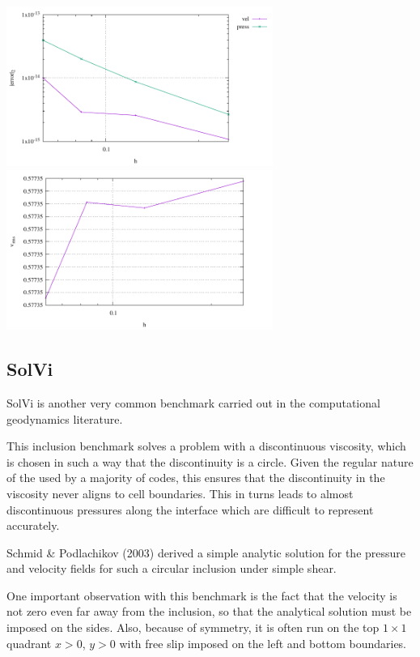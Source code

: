 \documentclass[a4paper]{article}
\begin{document}
\begin{center}
\includegraphics[width=8.7cm]{./results/benchmark_simple_shear/convergence.pdf}
\includegraphics[width=8.7cm]{./results/benchmark_simple_shear/vrms.pdf}
\end{center}



\subsection{SolVi}

SolVi is another very common benchmark carried out in the computational 
geodynamics literature.

This inclusion benchmark solves a problem with a discontinuous viscosity, 
which is chosen in such a way that the discontinuity is a circle.                
Given the regular nature of the used by a majority of codes, 
this ensures that the discontinuity in the viscosity never aligns to cell boundaries.
This in turns leads to almost discontinuous pressures along the interface which are difficult 
to represent accurately.

Schmid \& Podlachikov (2003) \cite{scpo03}
derived a simple analytic solution for the pressure and velocity fields for such a circular
inclusion under simple shear.

One important observation with this benchmark is the fact that the velocity is not zero even far 
away from the inclusion, so that the analytical solution must be imposed on the sides.
Also, because of symmetry, it is often run on the top $1\times 1$ quadrant $x>0$, $y>0$ with 
free slip imposed on the left and bottom boundaries.
\end{document}
